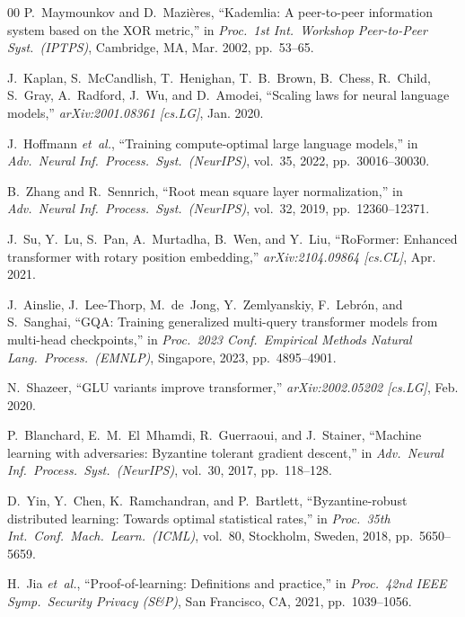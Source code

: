 \documentclass[conference]{IEEEtran}
\begin{document}
\begin{thebibliography}{00}
P.~Maymounkov and D.~Mazi\`{e}res, ``Kademlia: A peer-to-peer information system based on the XOR metric,'' in \emph{Proc.\ 1st Int.\ Workshop Peer-to-Peer Syst.\ (IPTPS)}, Cambridge, MA, Mar. 2002, pp.~53--65.

J.~Kaplan, S.~McCandlish, T.~Henighan, T.~B.~Brown, B.~Chess, R.~Child, S.~Gray, A.~Radford, J.~Wu, and D.~Amodei, ``Scaling laws for neural language models,'' \emph{arXiv:2001.08361 [cs.LG]}, Jan. 2020.

J.~Hoffmann \emph{et~al.}, ``Training compute-optimal large language models,'' in \emph{Adv.\ Neural Inf.\ Process.\ Syst.\ (NeurIPS)}, vol.~35, 2022, pp.~30016--30030.

B.~Zhang and R.~Sennrich, ``Root mean square layer normalization,'' in \emph{Adv.\ Neural Inf.\ Process.\ Syst.\ (NeurIPS)}, vol.~32, 2019, pp.~12360--12371.

J.~Su, Y.~Lu, S.~Pan, A.~Murtadha, B.~Wen, and Y.~Liu, ``RoFormer: Enhanced transformer with rotary position embedding,'' \emph{arXiv:2104.09864 [cs.CL]}, Apr. 2021.

J.~Ainslie, J.~Lee-Thorp, M.~de~Jong, Y.~Zemlyanskiy, F.~Lebr\'{o}n, and S.~Sanghai, ``GQA: Training generalized multi-query transformer models from multi-head checkpoints,'' in \emph{Proc.\ 2023 Conf.\ Empirical Methods Natural Lang.\ Process.\ (EMNLP)}, Singapore, 2023, pp.~4895--4901.

N.~Shazeer, ``GLU variants improve transformer,'' \emph{arXiv:2002.05202 [cs.LG]}, Feb. 2020.

P.~Blanchard, E.~M.~El~Mhamdi, R.~Guerraoui, and J.~Stainer, ``Machine learning with adversaries: Byzantine tolerant gradient descent,'' in \emph{Adv.\ Neural Inf.\ Process.\ Syst.\ (NeurIPS)}, vol.~30, 2017, pp.~118--128.

D.~Yin, Y.~Chen, K.~Ramchandran, and P.~Bartlett, ``Byzantine-robust distributed learning: Towards optimal statistical rates,'' in \emph{Proc.\ 35th Int.\ Conf.\ Mach.\ Learn.\ (ICML)}, vol.~80, Stockholm, Sweden, 2018, pp.~5650--5659.

H.~Jia \emph{et~al.}, ``Proof-of-learning: Definitions and practice,'' in \emph{Proc.\ 42nd IEEE Symp.\ Security Privacy (S\&P)}, San Francisco, CA, 2021, pp.~1039--1056.


\end{thebibliography}
\end{document}
